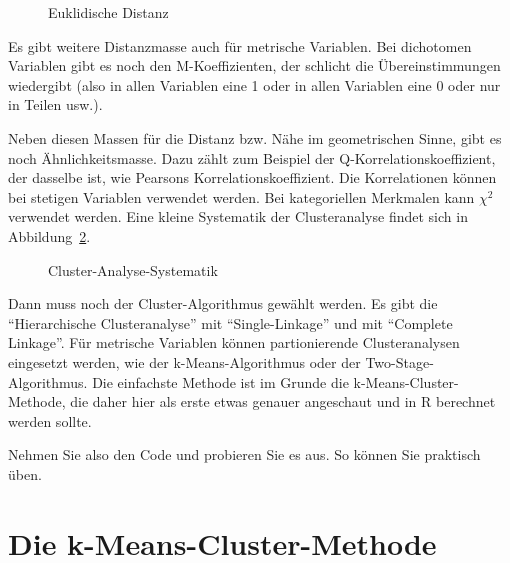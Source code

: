 \documentclass[
  10pt,
  letterpaper,
  a4paper, twoside]{scrreprt}
\begin{document}
\begin{figure}


\caption{\label{fig-euclidiean-distance}Euklidische Distanz}

\end{figure}%

Es gibt weitere Distanzmasse auch für metrische Variablen. Bei
dichotomen Variablen gibt es noch den M-Koeffizienten, der schlicht die
Übereinstimmungen wiedergibt (also in allen Variablen eine 1 oder in
allen Variablen eine 0 oder nur in Teilen usw.).

Neben diesen Massen für die Distanz bzw. Nähe im geometrischen Sinne,
gibt es noch Ähnlichkeitsmasse. Dazu zählt zum Beispiel der
Q-Korrelationskoeffizient, der dasselbe ist, wie Pearsons
Korrelationskoeffizient. Die Korrelationen können bei stetigen Variablen
verwendet werden. Bei kategoriellen Merkmalen kann \(\chi^2\) verwendet
werden. Eine kleine Systematik der Clusteranalyse findet sich in
Abbildung~\ref{fig-Clustersystematik}.

\begin{figure}


\caption{\label{fig-Clustersystematik}Cluster-Analyse-Systematik}

\end{figure}%

Dann muss noch der Cluster-Algorithmus gewählt werden. Es gibt die
\enquote{Hierarchische Clusteranalyse} mit \enquote{Single-Linkage} und
mit \enquote{Complete Linkage}. Für metrische Variablen können
partionierende Clusteranalysen eingesetzt werden, wie der
k-Means-Algorithmus oder der Two-Stage-Algorithmus. Die einfachste
Methode ist im Grunde die k-Means-Cluster-Methode, die daher hier als
erste etwas genauer angeschaut und in R berechnet werden sollte.

Nehmen Sie also den Code und probieren Sie es aus. So können Sie
praktisch üben.

\section{Die k-Means-Cluster-Methode}\label{die-k-means-cluster-methode}
\end{document}
